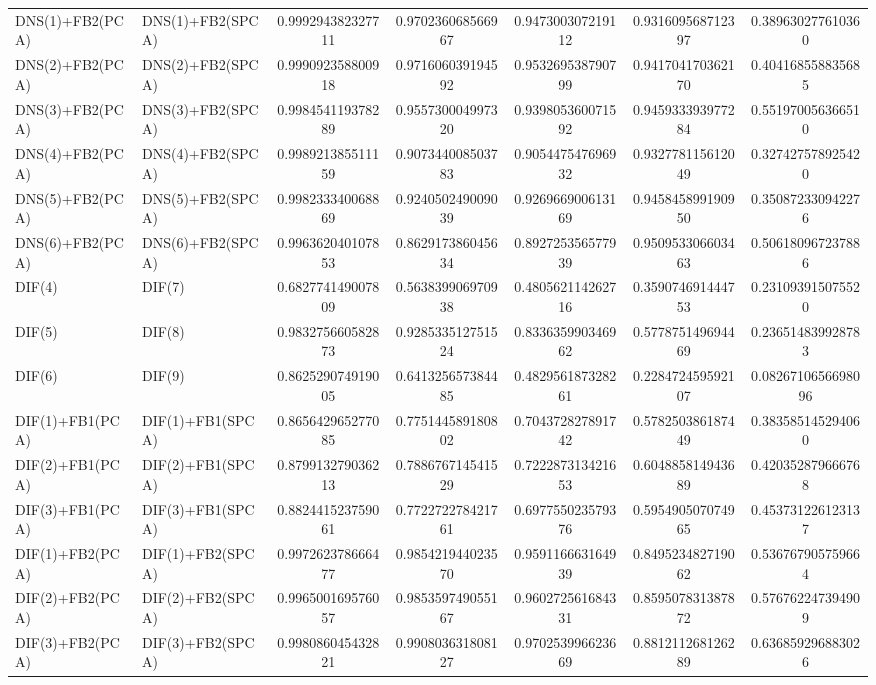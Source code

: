 \begin{table}[H]
\begin{tabular}{llSSSSS}
DNS(1)+FB2(PCA) & DNS(1)+FB2(SPCA) & 0.999294382327711 & 0.970236068566967 & 0.947300307219112 & 0.931609568712397 & 0.389630277610360 \\ 
DNS(2)+FB2(PCA) & DNS(2)+FB2(SPCA) & 0.999092358800918 & 0.971606039194592 & 0.953269538790799 & 0.941704170362170 & 0.404168558835685 \\ 
DNS(3)+FB2(PCA) & DNS(3)+FB2(SPCA) & 0.998454119378289 & 0.955730004997320 & 0.939805360071592 & 0.945933393977284 & 0.551970056366510 \\ 
DNS(4)+FB2(PCA) & DNS(4)+FB2(SPCA) & 0.998921385511159 & 0.907344008503783 & 0.905447547696932 & 0.932778115612049 & 0.327427578925420 \\ 
DNS(5)+FB2(PCA) & DNS(5)+FB2(SPCA) & 0.998233340068869 & 0.924050249009039 & 0.926966900613169 & 0.945845899190950 & 0.350872330942276 \\ 
DNS(6)+FB2(PCA) & DNS(6)+FB2(SPCA) & 0.996362040107853 & 0.862917386045634 & 0.892725356577939 & 0.950953306603463 & 0.506180967237886 \\ 
DIF(4) & DIF(7) & 0.682774149007809 & 0.563839906970938 & 0.480562114262716 & 0.359074691444753 & 0.231093915075520 \\ 
DIF(5) & DIF(8) & 0.983275660582873 & 0.928533512751524 & 0.833635990346962 & 0.577875149694469 & 0.236514839928783 \\ 
DIF(6) & DIF(9) & 0.862529074919005 & 0.641325657384485 & 0.482956187328261 & 0.228472459592107 & 0.0826710656698096 \\ 
DIF(1)+FB1(PCA) & DIF(1)+FB1(SPCA) & 0.865642965277085 & 0.775144589180802 & 0.704372827891742 & 0.578250386187449 & 0.383585145294060 \\ 
DIF(2)+FB1(PCA) & DIF(2)+FB1(SPCA) & 0.879913279036213 & 0.788676714541529 & 0.722287313421653 & 0.604885814943689 & 0.420352879666768 \\ 
DIF(3)+FB1(PCA) & DIF(3)+FB1(SPCA) & 0.882441523759061 & 0.772272278421761 & 0.697755023579376 & 0.595490507074965 & 0.453731226123137 \\ 
DIF(1)+FB2(PCA) & DIF(1)+FB2(SPCA) & 0.997262378666477 & 0.985421944023570 & 0.959116663164939 & 0.849523482719062 & 0.536767905759664 \\ 
DIF(2)+FB2(PCA) & DIF(2)+FB2(SPCA) & 0.996500169576057 & 0.985359749055167 & 0.960272561684331 & 0.859507831387872 & 0.576762247394909 \\ 
DIF(3)+FB2(PCA) & DIF(3)+FB2(SPCA) & 0.998086045432821 & 0.990803631808127 & 0.970253996623669 & 0.881211268126289 & 0.636859296883026 \\ \bottomrule 
\end{tabular}
\end{table}


